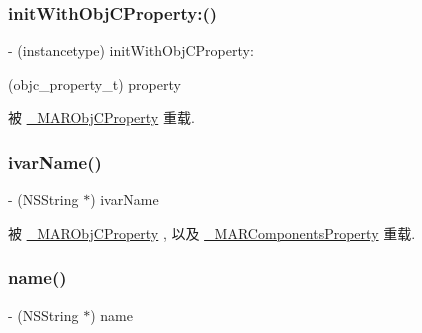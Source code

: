 \subsubsection{\texorpdfstring{init\+With\+Obj\+C\+Property\+:()}{initWithObjCProperty:()}}
{\footnotesize\ttfamily -\/ (instancetype) init\+With\+Obj\+C\+Property\+: \begin{DoxyParamCaption}\item[{(objc\+\_\+property\+\_\+t)}]{property }\end{DoxyParamCaption}}



被 \hyperlink{interface___m_a_r_obj_c_property_a4854c8972a664dada2d8faee928cee8a}{\+\_\+\+M\+A\+R\+Obj\+C\+Property} 重载.

\mbox{\label{interface_m_a_r_property_a41b6de373b3c625532094586dd93d01c}} 
\subsubsection{\texorpdfstring{ivar\+Name()}{ivarName()}}
{\footnotesize\ttfamily -\/ (N\+S\+String $\ast$) ivar\+Name \begin{DoxyParamCaption}{ }\end{DoxyParamCaption}}



被 \hyperlink{interface___m_a_r_obj_c_property_a9a1df3b591493be4dbe9484c509faab0}{\+\_\+\+M\+A\+R\+Obj\+C\+Property} , 以及 \hyperlink{interface___m_a_r_components_property_a6c8bca188d0259d4902e7608fc08d551}{\+\_\+\+M\+A\+R\+Components\+Property} 重载.

\mbox{\label{interface_m_a_r_property_a1ee68bcd7917d7a0c991784f011b1476}} 
\subsubsection{\texorpdfstring{name()}{name()}}
{\footnotesize\ttfamily -\/ (N\+S\+String $\ast$) name \begin{DoxyParamCaption}{ }\end{DoxyParamCaption}}



